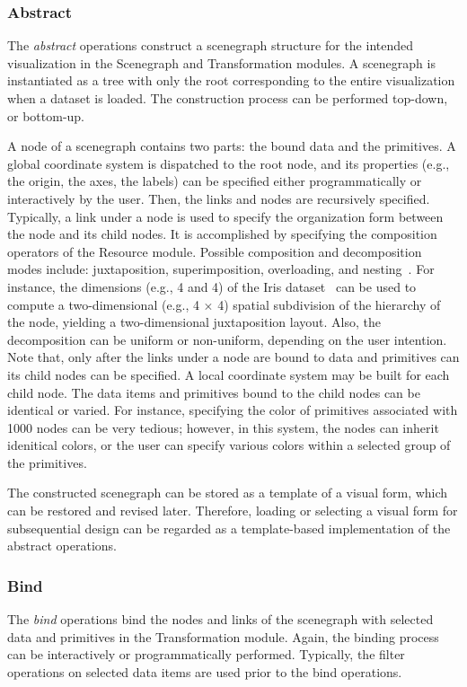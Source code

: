  \subsubsection{Abstract} The \emph{abstract} operations construct a scenegraph structure for the intended visualization in the Scenegraph and Transformation modules. A scenegraph is instantiated as a tree with only the root corresponding to the entire visualization when a dataset is loaded. The construction process can be performed top-down, or bottom-up.

 A node of a scenegraph contains two parts: the bound data and the primitives. A global coordinate system is dispatched to the root node, and its properties (e.g., the origin, the axes, the labels) can be specified  either programmatically or interactively by the user. Then, the links and nodes are recursively specified. Typically, a link under a node is used to specify the organization form between the node and its child nodes. It is accomplished by specifying the composition operators of the Resource module. Possible composition and decomposition modes include: juxtaposition, superimposition, overloading, and nesting~\cite{Elmqvist:2012:PVIS}.  For instance, the dimensions (e.g., 4 and 4) of the Iris dataset~\cite{IrisDataset} can be used to compute a two-dimensional (e.g., 4 $\times$ 4) spatial subdivision of the hierarchy of the node, yielding a two-dimensional juxtaposition layout. Also, the decomposition can be uniform or non-uniform, depending on the user intention.  Note that, only after the links under a node are bound to data and primitives can its child nodes can be specified. A local coordinate system may be built for each child node. The data items and primitives bound to the child nodes can be identical or varied. For instance, specifying the color of primitives associated with 1000 nodes can be very tedious; however, in this system, the nodes can inherit idenitical colors, or the user can specify various colors within a selected group of the primitives.

 The constructed scenegraph can be stored as a template of a visual form, which can be restored and revised later. Therefore, loading or selecting a visual form for subsequential design can be regarded as a template-based  implementation of the abstract operations.

 \subsubsection{Bind} The \emph{bind} operations bind the nodes and links of the scenegraph with selected data and primitives in the Transformation module. Again, the binding process can be interactively or programmatically performed. Typically, the filter operations on selected data items are used prior to the bind operations.

